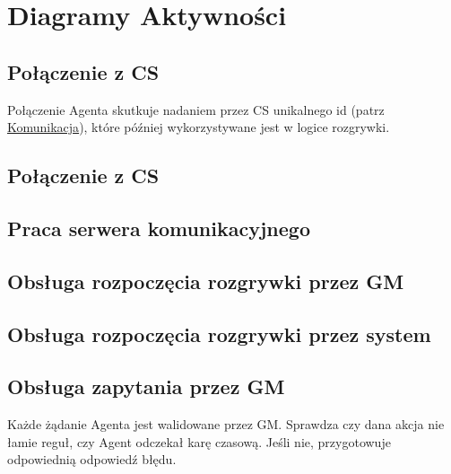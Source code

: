 \documentclass[../Dokumentacja.tex]{subfiles}
\begin{document}
\section{Diagramy Aktywności}
\subsection{Połączenie z CS}
Połączenie Agenta skutkuje nadaniem przez CS unikalnego id (patrz \hyperref[sec:komunikacja]{Komunikacja}),
które później wykorzystywane jest w logice rozgrywki.

\begin{landscape}
    \subsection{Połączenie z CS}
\end{landscape}

\subsection{Praca serwera komunikacyjnego}

\subsection{Obsługa rozpoczęcia rozgrywki przez GM}

\begin{landscape}
    \subsection{Obsługa rozpoczęcia rozgrywki przez system}
\end{landscape}

\subsection{Obsługa zapytania przez GM}
Każde żądanie Agenta jest walidowane przez GM. Sprawdza czy dana akcja nie łamie reguł, czy Agent odczekał karę czasową. Jeśli nie,
przygotowuje odpowiednią odpowiedź błędu.
\end{document}
